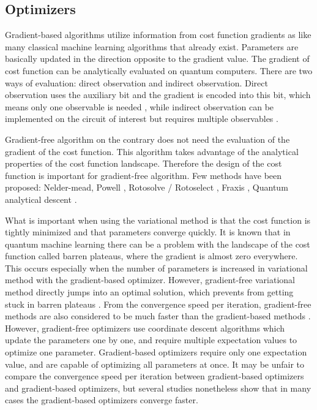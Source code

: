 \subsection{Optimizers}
\par Gradient-based algorithms utilize information from cost function gradients as like many classical machine learning algorithms that already exist. Parameters are basically updated in the direction opposite to the gradient value. The gradient of cost function can be analytically evaluated on quantum computers. There are two ways of evaluation: direct observation and indirect observation. Direct observation uses the auxiliary bit and the gradient is encoded into this bit, which means only one observable is needed \cite{Romero_2019}, while indirect observation can be implemented on the circuit of interest but requires multiple observables \cite{PhysRevResearch.1.013006}.

\par Gradient-free algorithm on the contrary does not need the evaluation of the gradient of the cost function. This algorithm takes advantage of the analytical properties of the cost function landscape. Therefore the design of the cost function is important for gradient-free algorithm. Few methods have been proposed:
Nelder-mead\cite{10.1093/comjnl/7.4.308}, Powell \cite{Pellow_Jarman_2021}, 
Rotosolve / Rotoselect \cite{Nakanishi_2020,Ostaszewski_2021}, Fraxis \cite{fraxis1,Wada_2022}, Quantum analytical descent \cite{koczor}.

\par What is important when using the variational method is that the cost function is tightly minimized and that parameters converge quickly. It is known that in quantum machine learning there can be a problem with the landscape of the cost function called barren plateaus, where the gradient is almost zero everywhere. This occurs especially when the number of parameters is increased in variational method with the gradient-based optimizer. However, gradient-free variational method directly jumps into an optimal solution, which prevents from getting stuck in barren plateaus \cite{book1}. From the convergence speed per iteration, gradient-free methods are also considered to be much faster than the gradient-based methods \cite{TILLY20221}. However, gradient-free optimizers use coordinate descent algorithms which update the parameters one by one, and require multiple expectation values to optimize one parameter. Gradient-based optimizers require only one expectation value, and are capable of optimizing all parameters at once. It may be unfair to compare the convergence speed per iteration between gradient-based optimizers and gradient-based optimizers, but several studies nonetheless show that in many cases the gradient-based optimizers converge faster\cite{Ostaszewski_2021,PhysRevResearch.2.043158, https://doi.org/10.48550/arxiv.1912.08660}.